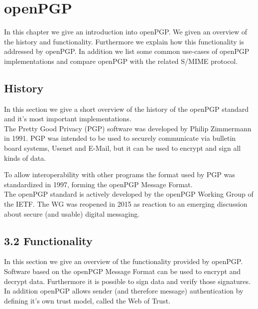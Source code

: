 \chapter{openPGP} \label{chapter:openpgp}

In this chapter we give an introduction into openPGP. We given an overview of the history and functionality. Furthermore we explain how this functionality is addressed by openPGP. In addition we list some common use-cases of openPGP implementations and compare openPGP with the related S/MIME protocol. 


\section{History}

In this section we give a short overview of the history of the openPGP standard and it's most important implementations. \\


The Pretty Good Privacy (PGP) software was developed by Philip Zimmermann in 1991.  PGP was intended to be used to securely communicate via bulletin board systems, Usenet and E-Mail, but it can be used to encrypt and sign all kinds of data.

To allow interoperability with other programs the format used by PGP was standardized in 1997, forming the openPGP Message Format. \\


The openPGP standard is actively developed by the openPGP Working Group of the IETF. The WG was reopened in 2015 as reaction to an emerging discussion about secure (and usable) digital messaging.

\section{3.2 Functionality} \label{section:openpgp:functionality}

In this section we give an overview of the functionality provided by openPGP. \\


Software based on the openPGP Message Format can be used to encrypt and decrypt data. Furthermore it is possible to sign data and verify those signatures. In addition openPGP allows sender (and therefore message) authentication by defining it's own trust model, called the Web of Trust. 

